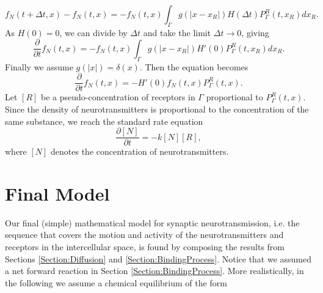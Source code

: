\documentclass{article}
\begin{document}
\begin{equation*}
        f_N(t + \Delta t, x) - f_N(t, x) = -f_N(t,x)\int_{\Gamma}^{} g(|x - x_R|)H(\Delta t)P_\Gamma^R(t, x_R) dx_R.
\end{equation*}
As $H(0) = 0$, we can divide by $\Delta t$ and take the limit $\Delta t \rightarrow 0$, giving 
\begin{equation*}
        \frac{\partial}{\partial t}f_N(t, x) = -f_N(t,x)\int_{\Gamma}^{} g(|x - x_R|)H'(0)P_\Gamma^R(t, x_R) dx_R.
\end{equation*}
Finally we assume $g(|x|) = \delta (x)$. Then the equation becomes 
\begin{equation*}
       \frac{\partial}{\partial t}f_N(t, x) = -H'(0)f_N(t,x)P_\Gamma^R (t, x).
\end{equation*}
Let $[R]$ be a pseudo-concentration of receptors in $\Gamma$ proportional to $P_\Gamma^R(t,x)$.
Since the density of neurotransmitters is proportional to the concentration of the same substance, we reach the standard rate equation
\begin{equation*}
\frac{\partial [N]}{\partial t} = - k [N][R],
\end{equation*}
where $[N]$ denotes the concentration of neurotransmitters. 

\section{Final Model}
Our final (simple) mathematical model for synaptic neurotransmission, i.e. the sequence that covers the motion and activity of the neurotransmitters and receptors in the intercellular space, is found by composing the results from Sections \ref{Section:Diffusion} and \ref{Section:BindingProcess}. Notice that we assumed a net forward reaction in Section \ref{Section:BindingProcess}. More realistically, in the following we assume a chemical equilibrium of the form 
\end{document}
